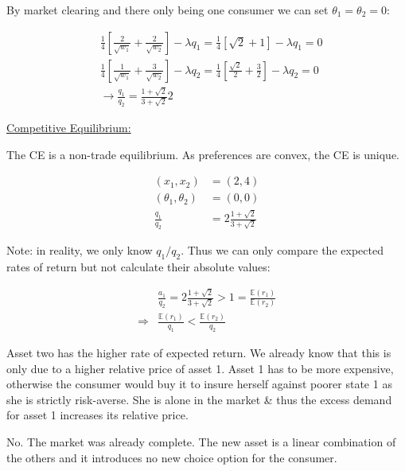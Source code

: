 {\begin{enumerate}[label=(\alph*)]
{By market clearing and there only being one consumer we can set $\theta_{1}=\theta_{2}=0$:

$$
\begin{aligned}
& \frac{1}{4}\left[\frac{2}{\sqrt{w_{1}}}+\frac{2}{\sqrt{w_{2}}}\right]-\lambda q_{1}=\frac{1}{4}[\sqrt{2}+1]-\lambda q_{1}=0 \\
& \frac{1}{4}\left[\frac{1}{\sqrt{w_{1}}}+\frac{3}{\sqrt{w_{2}}}\right]-\lambda q_{2}=\frac{1}{4}\left[\frac{\sqrt{2}}{2}+\frac{3}{2}\right]-\lambda q_{2}=0 \\
& \longrightarrow \frac{q_{1}}{q_{2}}=\frac{1+\sqrt{2}}{3+\sqrt{2}} 2
\end{aligned}
$$

\underline{Competitive Equilibrium:}

The CE is a non-trade equilibrium. As preferences are convex, the CE is unique.

$$
\begin{aligned}
\left(x_{1}, x_{2}\right) & =(2,4) \\
\left(\theta_{1}, \theta_{2}\right) & =(0,0) \\
\frac{q_{1}}{q_{2}} & =2 \frac{1+\sqrt{2}}{3+\sqrt{2}}
\end{aligned}
$$
}
{\item 
Note: in reality, we only know $q_{1} / q_{2}$. Thus we can only compare the expected rates of return but not calculate their absolute values:

$$
\begin{aligned}
& \frac{a_{1}}{q_{2}}=2 \frac{1+\sqrt{2}}{3+\sqrt{2}}>1=\frac{\mathbb{E}\left(r_{1}\right)}{\mathbb{E}\left(r_{2}\right)} \\
\Rightarrow & \frac{\mathbb{E}\left(r_{1}\right)}{q_{1}}<\frac{\mathbb{E}\left(r_{2}\right)}{q_{2}}
\end{aligned}
$$

Asset two has the higher rate of expected return. We already know that this is only due to a higher relative price of asset 1. Asset 1 has to be more expensive, otherwise the consumer would buy it to insure herself against poorer state 1 as she is strictly risk-averse. She is alone in the market \& thus the excess demand for asset 1 increases its relative price.
}
{\item 
No. The market was already complete. The new
asset is a linear combination of the others and it introduces no new choice option for the consumer.
}
\end{enumerate}
}